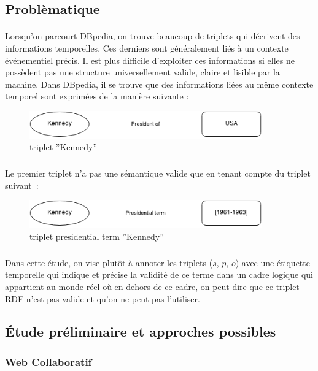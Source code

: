 \documentclass[12pt,a4	]{report}
\begin{document}
\subsection*{Problèmatique}
\paragraph{}
Lorsqu’on parcourt DBpedia, on trouve beaucoup de triplets qui décrivent des informations temporelles. Ces derniers sont généralement liés à un contexte événementiel précis.
Il est plus difficile d’exploiter ces informations si elles ne possèdent pas une structure universellement valide, claire et lisible par la machine. Dans DBpedia, il se trouve que des informations liées au même contexte temporel sont exprimées de la manière suivante : 
\begin{figure}[H]
        \centering
                \centering
                \includegraphics[width=10cm]{ken.png}
               \caption{triplet ''Kennedy''}

\end{figure}
\subparagraph{}
Le premier triplet n'a pas une sémantique valide que en tenant compte du triplet suivant~: 
\begin{figure}[H]
        \centering
                \centering
                \includegraphics[width=10cm]{presidterm.png}
               \caption{triplet presidential term ''Kennedy''}

\end{figure}
\subparagraph{}
Dans cette étude, on vise plutôt à annoter les triplets ($s$, $p$, $o$) avec une étiquette temporelle qui indique et précise la validité de ce terme dans un cadre logique qui appartient au monde réel où en dehors de ce cadre, on peut dire que ce triplet RDF n’est pas valide et qu’on ne peut pas l’utiliser.

\subsection*{Étude préliminaire et approches possibles}
\subsubsection*{Web Collaboratif}
\end{document}
